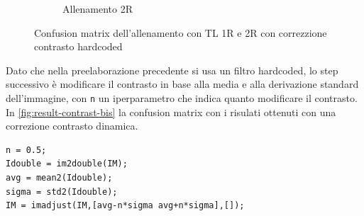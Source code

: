 \begin{figure}[ht]
\begin{subfigure}{0.45\textwidth}
        \caption{Allenamento 2R} 
    \end{subfigure}
    \caption{Confusion matrix dell'allenamento con TL 1R e 2R con correzzione contrasto hardcoded}
    \label{fig:result-contrast}
\end{figure}

Dato che nella preelaborazione precedente si usa un filtro hardcoded, lo step successivo è modificare il  contrasto in base alla media e alla derivazione standard dell'immagine, con \lstinline{n} un iperparametro che indica quanto modificare il contrasto. In \cref{fig:result-contrast-bis}  la confusion matrix con i risulati ottenuti con una correzione contrasto dinamica.
\begin{lstlisting}
n = 0.5;  
Idouble = im2double(IM); 
avg = mean2(Idouble);
sigma = std2(Idouble);
IM = imadjust(IM,[avg-n*sigma avg+n*sigma],[]);
\end{lstlisting}

